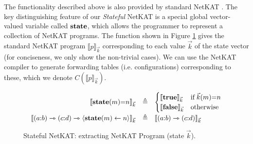 \documentclass[pldi-cameraready]{sigplanconf}
\newcommand{\kw}[1]{\text{\tt\bf #1}}
\begin{document}
\noindent
The functionality described above is also provided by standard NetKAT \cite{smolka2015}.
The key distinguishing feature of our {\em Stateful} NetKAT is a special
global vector-valued variable called $\kw{state}$, which allows the
programmer to represent a collection of NetKAT programs. The function
shown in Figure \ref{fig:state_static_semantics} gives the standard
NetKAT program $\llbracket p \rrbracket_{\vec{k}}$ corresponding to
each value $\vec{k}$ of the state vector (for conciseness, we only
show the non-trivial cases).  We can use the NetKAT compiler
\cite{smolka2015} to generate forwarding tables (i.e. configurations)
corresponding to these, which we denote $C(\llbracket p
\rrbracket_{\vec{k}})$.

\begin{figure}[t]
\footnotesize
\begin{displaymath}
\begin{array}{rcl}
\llbracket \kw{state}(m){=}n \rrbracket_{\vec{k}} & \triangleq & 
\begin{cases}
\llbracket \kw{true} \rrbracket_{\vec{k}} & \text{if}\; \vec{k}(m){=}n \\
\llbracket \kw{false} \rrbracket_{\vec{k}} & \text{otherwise}
\end{cases} \vspace{2pt} \\
\llbracket (a{:}b) \rightarrowtriangle (c{:}d) \rightarrowtriangle \langle \kw{state}(m) \leftarrow n \rangle\rrbracket_{\vec{k}} & \triangleq &
\llbracket (a{:}b) \rightarrowtriangle (c{:}d) \rrbracket_{\vec{k}} \\
\end{array}
\end{displaymath}
\caption{Stateful NetKAT: extracting NetKAT Program (state $\vec{k}$).}
\label{fig:state_static_semantics}
\end{figure}
\end{document}
